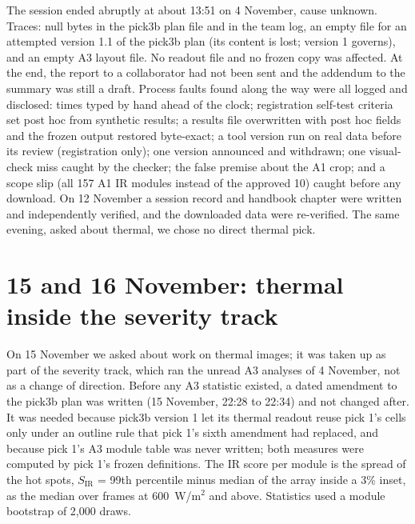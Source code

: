 The session ended abruptly at about 13:51 on 4 November, cause unknown. Traces: null bytes in the pick3b plan file and in the team
log, an empty file for an attempted version 1.1 of the pick3b plan (its content is lost; version 1 governs), and an empty A3 layout
file. No readout file and no frozen copy was affected. At the end, the report to a collaborator had not been sent and the addendum to
the summary was still a draft. Process faults found along the way were all logged and disclosed: times typed by hand ahead of the
clock; registration self-test criteria set post hoc from synthetic results; a results file overwritten with post hoc fields and the
frozen output restored byte-exact; a tool version run on real data before its review (registration only); one version announced and
withdrawn; one visual-check miss caught by the checker; the false premise about the A1 crop; and a scope slip (all 157 A1 IR modules
instead of the approved 10) caught before any download. On 12 November a session record and handbook chapter were written and
independently verified, and the downloaded data were re-verified. The same evening, asked about thermal, we chose no direct
thermal pick.

\section{15 and 16 November: thermal inside the severity track}\label{sec:thermal-severity}

On 15 November we asked about work on thermal images; it was taken up as part of the severity track, which ran the unread A3
analyses of 4 November, not as a change of direction. Before any A3 statistic existed, a dated amendment to the pick3b plan was
written (15 November, 22:28 to 22:34) and not changed after. It was needed because pick3b version 1 let its thermal readout reuse
pick 1's cells only under an outline rule that pick 1's sixth amendment had replaced, and because pick 1's A3 module table was never
written; both measures were computed by pick 1's frozen definitions. The IR score per module is the spread of the hot spots,
$S_\mathrm{IR}$ = 99th percentile minus median of the array inside a 3\% inset, as the median over frames at 600~W/m$^2$ and above.
Statistics used a module bootstrap of 2,000 draws.

